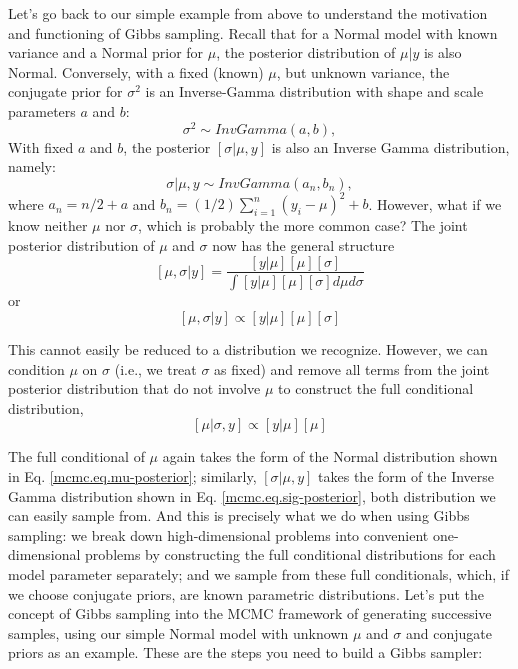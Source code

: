 Let's go back to our simple example from above to understand the
motivation and functioning of Gibbs sampling. Recall that for a Normal
model with known variance and a Normal prior for $\mu$, the posterior
distribution of $\mu|y$ is also Normal. Conversely, with a fixed
(known) $\mu$, but unknown variance, the conjugate prior for
$\sigma^2$ is an Inverse-Gamma distribution with shape and scale
parameters $a$ and $b$:
\[
\sigma^2 \sim InvGamma(a,b),
\]
With fixed $a$ and $b$, the posterior $[\sigma|\mu,y]$ is also an Inverse Gamma distribution, namely:
\begin{equation}
\sigma|\mu,y \sim InvGamma (a_n, b_n),
\label{mcmc.eq.sig-posterior}
\end{equation}
 where  $a_n = n/2   + a$ and $b_n = (1/2) \displaystyle\sum\limits_{i=1}^{n} (y_i-\mu)^2 + b$.
However, what if we know neither $\mu$ nor $\sigma$, which is probably the
more common case? The joint posterior distribution of $\mu$ and $\sigma$
now has the general structure
\[
[\mu, \sigma|y] = \frac{[y|\mu] [\mu] [\sigma]}{ \int [y|\mu] [\mu] [\sigma] d\mu d\sigma }
\]
or
\[
[\mu, \sigma|y] \propto [y|\mu] [\mu] [\sigma]
\]

This cannot easily be reduced to a distribution we recognize. However,
we can condition $\mu$ on $\sigma$ (i.e., we treat $\sigma$ as fixed) and remove
all terms from the joint posterior distribution that do not involve $\mu$
to construct the full conditional distribution,
\[
[\mu|\sigma,y]  \propto [y|\mu] [\mu]
\]

The full conditional of $\mu$ again takes the form of the Normal
distribution shown in Eq. \ref{mcmc.eq.mu-posterior}; similarly, $[\sigma|\mu,y]$ takes
the form of the Inverse Gamma distribution shown in
Eq. \ref{mcmc.eq.sig-posterior}, both distribution we can easily sample
from. And this is precisely what we do when using Gibbs sampling: we
break down high-dimensional problems into convenient one-dimensional
problems by constructing the full conditional distributions for each
model parameter separately; and we sample from these full
conditionals, which, if we choose conjugate priors, are known
parametric distributions.
Let's put the concept of Gibbs sampling into the MCMC framework of
generating successive samples, using our simple Normal model with
unknown $\mu$ and $\sigma$ and conjugate priors as an example. These are the
steps you need to build a Gibbs sampler:

